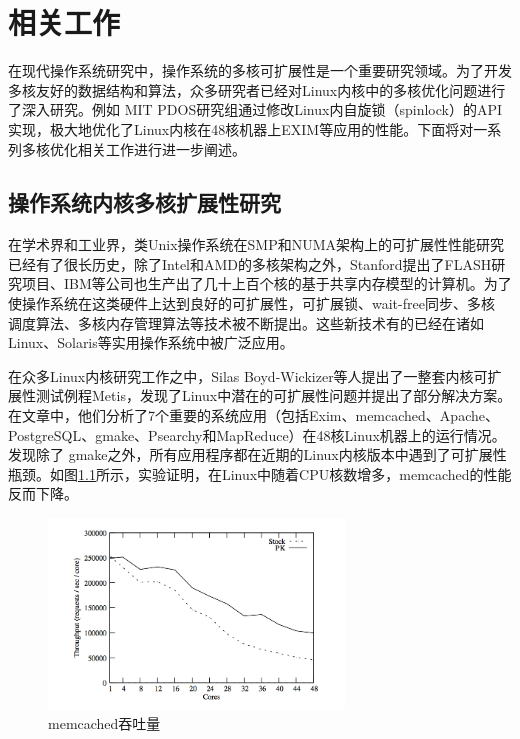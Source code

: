 

\chapter{相关工作}
\label{cha:relwork}

在现代操作系统研究中，操作系统的多核可扩展性是一个重要研究领域。为了开发多核友好的数据结构和算法，众多研究者已经对Linux内核中的多核优化问题进行了深入研究。例如
MIT PDOS研究组通过修改Linux内自旋锁（spinlock）的API实现\cite{locks:linuxsymp}，极大地优化了Linux内核在48核机器上EXIM等应用的性能。下面将对一系列多核优化相关工作进行进一步阐述。

\section{操作系统内核多核扩展性研究}
在学术界和工业界，类Unix操作系统在SMP和NUMA架构上的可扩展性性能研究已经有了很长历史，除了Intel和AMD的多核架构之外，Stanford提出了FLASH研究项目\cite{kuskin1994stanford}、IBM等公司也生产出了几十上百个核的基于共享内存模型的计算机。为了使操作系统在这类硬件上达到良好的可扩展性，可扩展锁、wait-free同步、多核
调度算法、多核内存管理算法等技术被不断提出。这些新技术有的已经在诸如Linux、Solaris等实用操作系统中被广泛应用。

在众多Linux内核研究工作之中，Silas Boyd-Wickizer等人提出了一整套内核可扩展性测试例程Metis\cite{linux:osdi10}，发现了Linux中潜在的可扩展性问题并提出了部分解决方案。
在文章中，他们分析了7个重要的系统应用（包括Exim、memcached、Apache、PostgreSQL、gmake、Psearchy和MapReduce）在48核Linux机器上的运行情况。发现除了
gmake之外，所有应用程序都在近期的Linux内核版本中遇到了可扩展性瓶颈。如图\ref{fig:memcached}所示，实验证明，在Linux中随着CPU核数增多，memcached的性能反而下降。

\begin{figure}[ht]
\begin{center}
\includegraphics[width=0.7\textwidth]{figures/memcached_test.png}
\end{center}
\caption{memcached吞吐量\cite{linux:osdi10}}
\label{fig:memcached}
\end{figure}

